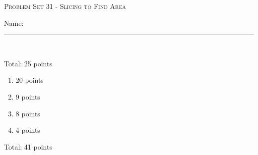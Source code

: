 \documentclass{article}
\begin{document}
\begin{center}
  \large\textsc{Problem Set 31 - Slicing to Find Area}
  
      \pspace{12pt}
  \begin{problemonly}\large Name: \rule{5cm}{0.15mm}\\ \end{problemonly}
\end{center}

\begin{grading}
  Total: 25 points
  
    \begin{enumerate}
    \item 20 points
    \item 9 points
    \item 8 points
    \item 4 points
    \end{enumerate}
    Total: 41 points
  
\end{grading}
\end{document}
